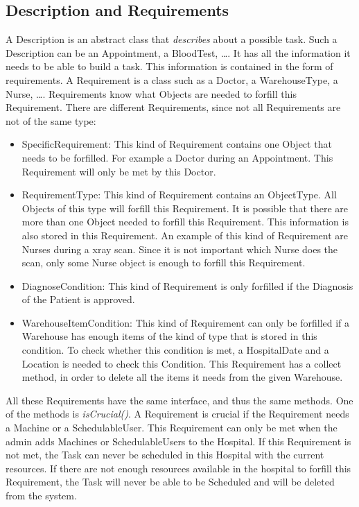 \documentclass[12pt]{article}
\begin{document}
\subsection{Description and Requirements}
A Description is an abstract class that \textit{describes} about a possible task. Such a Description can be an Appointment, a BloodTest, \dots.  It has all the information it needs to be able to build a task. This information is contained in the form of requirements. A Requirement is a class such as a Doctor, a WarehouseType, a Nurse, \dots. Requirements know what Objects are needed to forfill this Requirement. There are different Requirements, since not all Requirements are not of the same type:
\begin{itemize}
\item SpecificRequirement: This kind of Requirement contains one Object that needs to be forfilled. For example a Doctor during an Appointment. This Requirement will only be met by this Doctor.
\item RequirementType: This kind of Requirement contains an ObjectType. All Objects of this type will forfill this Requirement. It is possible that there are more than one Object needed to forfill this Requirement. This information is also stored in this Requirement. An example of this kind of Requirement are Nurses during a xray scan. Since it is not important which Nurse does the scan, only some Nurse object is enough to forfill this Requirement.
\item DiagnoseCondition: This kind of Requirement is only forfilled if the Diagnosis of the Patient is approved.
\item WarehouseItemCondition: This kind of Requirement can only be forfilled if a Warehouse has enough items of the kind of type that is stored in this condition. To check whether this condition is met, a HospitalDate and a Location is needed to check this Condition. This Requirement has a collect method, in order to delete all the items it needs from the given Warehouse.
\end{itemize}
All these Requirements have the same interface, and thus the same methods. One of the methods is \textit{isCrucial()}. A Requirement is crucial if the Requirement needs a Machine or a SchedulableUser. This Requirement can only be met when the admin adds Machines or SchedulableUsers to the Hospital. If this Requirement is not met, the Task can never be scheduled in this Hospital with the current resources. If there are not enough resources available in the hospital to forfill this Requirement, the Task will never be able to be Scheduled and will be deleted from the system.
\end{document}
